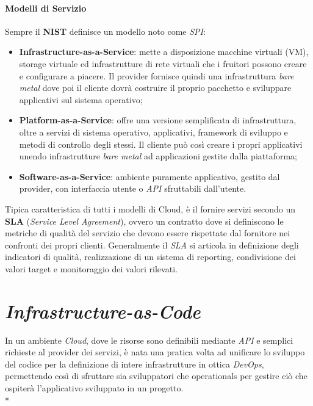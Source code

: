\documentclass[../main.tex]{subfiles}
\begin{document}
    	    \paragraph{Modelli di Servizio}
    	    Sempre il \textbf{NIST} definisce un modello noto come \emph{SPI}:
            \begin{itemize}
                \item \textbf{Infrastructure-as-a-Service}: mette a disposizione macchine virtuali (VM), storage virtuale ed infrastrutture di rete virtuali che i fruitori possono creare e configurare a piacere. Il provider fornisce quindi una infrastruttura \emph{bare metal} dove poi il cliente dovrà costruire il proprio pacchetto e sviluppare applicativi sul sistema operativo;
                \item \textbf{Platform-as-a-Service}: offre una versione semplificata di infrastruttura, oltre a servizi di sistema operativo, applicativi, framework di sviluppo e metodi di controllo degli stessi. Il cliente può così creare i propri applicativi unendo infrastrutture \emph{bare metal} ad applicazioni gestite dalla piattaforma;
                \item \textbf{Software-as-a-Service}: ambiente puramente applicativo, gestito dal provider, con interfaccia utente o \emph{API} sfruttabili dall'utente.
            \end{itemize}
    
            Tipica caratteristica di tutti i modelli di Cloud, è il fornire servizi secondo un \textbf{SLA} (\emph{Service Level Agreement})\cite{cloud_sla}, ovvero un contratto dove si definiscono le metriche di qualità del servizio che devono essere rispettate dal fornitore nei confronti dei propri clienti. Generalmente il \emph{SLA} si articola in definizione degli indicatori di qualità, realizzazione di un sistema di reporting, condivisione dei valori target e monitoraggio dei valori rilevati.
    
        \section{\emph{Infrastructure-as-Code}}
        
            In un ambiente \emph{Cloud}, dove le risorse sono definibili mediante \emph{API} e semplici richieste al provider dei servizi, è nata una pratica volta ad unificare lo sviluppo del codice per la definizione di intere infrastrutture in ottica \emph{DevOps}, permettendo così di sfruttare sia sviluppatori che operationals per gestire ciò che ospiterà l'applicativo sviluppato in un progetto.\\*
            
\end{document}
